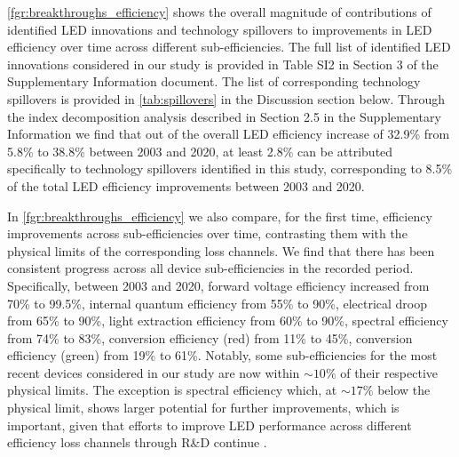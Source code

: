 \documentclass[parskip=full]{article}
\begin{document}
\cref{fgr:breakthroughs_efficiency} shows the overall magnitude of contributions of identified LED innovations and technology spillovers to improvements in LED efficiency over time across different sub-efficiencies. The full list of identified LED innovations considered in our study is provided in Table SI2 in Section 3 of the Supplementary Information document. The list of corresponding technology spillovers is provided in \cref{tab:spillovers} in the Discussion section below. Through the index decomposition analysis described in Section 2.5 in the Supplementary Information we find that out of the overall LED efficiency increase of 32.9\% from 5.8\% to 38.8\% between 2003 and 2020, at least 2.8\% can be attributed specifically to technology spillovers identified in this study, corresponding to 8.5\% of the total LED efficiency improvements between 2003 and 2020.

In \cref{fgr:breakthroughs_efficiency} we also compare, for the first time, efficiency improvements across sub-efficiencies over time, contrasting them with the physical limits of the corresponding loss channels. We find that there has been consistent progress across all device sub-efficiencies in the recorded period. Specifically, between 2003 and 2020, forward voltage efficiency increased from 70\% to 99.5\%, internal quantum efficiency from 55\% to 90\%, electrical droop from 65\% to 90\%, light extraction efficiency from 60\% to 90\%, spectral efficiency from 74\% to 83\%, conversion efficiency (red) from 11\% to 45\%, conversion efficiency (green) from 19\% to 61\%. Notably, some sub-efficiencies for the most recent devices considered in our study are now within $\sim10\%$ of their respective physical limits. The exception is spectral efficiency which, at $\sim17\%$ below the physical limit, shows larger potential for further improvements, which is important, given that efforts to improve LED performance across different efficiency loss channels through R\&D continue \cite{cho2017white, Weisbuch2020}. 
\end{document}
